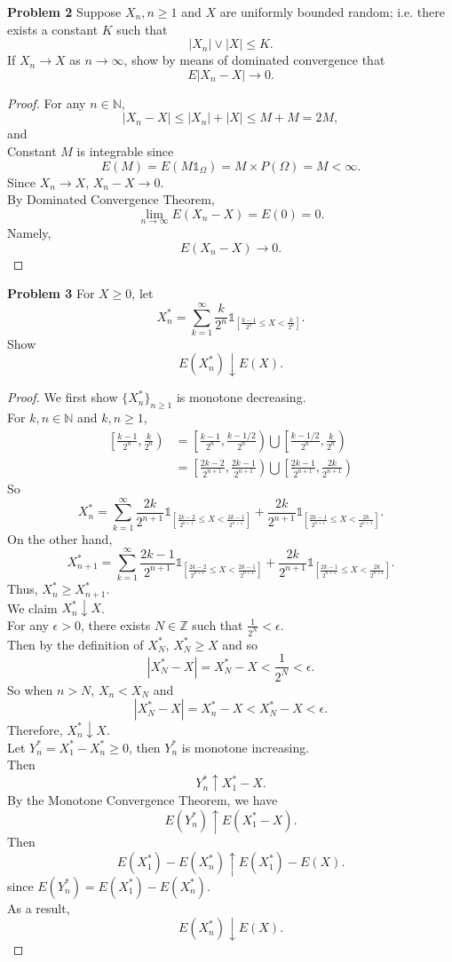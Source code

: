 \documentclass{article}
\newcommand{\idca}{\mathbb{1}}
\newcommand{\bbz}{\mathbb{Z}}
\newcommand{\bbn}{\mathbb{N}}
\begin{document}
\noindent \textbf{Problem 2} Suppose $X_n, n \geq 1$ and $X$ are uniformly bounded random; i.e. there exists a constant $K$ such that 
\[ |X_n| \vee |X| \leq K.\]
If $X_n \to X$ as $n \to \infty $, show by means of dominated convergence that 
\[E|X_n-X| \to 0.\]
\begin{proof}
  For any $n \in \bbn$,
  \[|X_n - X| \leq |X_n| + |X| \leq M + M =2M, \]
  and \\
  Constant $M$ is integrable since 
  \[ E(M)= E(M\idca_{\Omega}) = M\times P({\Omega}) =M < \infty.\]
  Since $X_n \to X$, $X_n - X \to 0$.\\
  By Dominated Convergence Theorem,
  \[\lim_{n\to \infty} E(X_n - X) = E(0) = 0.\]
  Namely,
  \[E(X_n - X) \to 0.\]

\end{proof}
\newpage

\noindent \textbf{Problem 3} For $X \geq 0$, let 
\[X_n^* = \sum_{k=1}^{\infty}\frac{k}{2^n}\idca_{[\frac{k-1}{2^n} \leq X < \frac{k}{2^n}]}.\]
Show 
\[ E(X_n^*) \downarrow E(X).\]

\begin{proof}
  We first show $\{X_n^*\}_{n \geq 1}$ is monotone decreasing.\\
  For $k,n \in \bbn$ and $k,n\geq 1$, 
  \begin{align*}
  	 \left.\left[\frac{k-1}{2^n},\frac{k}{2^n}\right.\right)  &= \left.\left[\frac{k-1}{2^n}, \frac{k-1/2}{2^n}\right)\right. \bigcup \left.\left[\frac{k-1/2}{2^n}, \frac{k}{2^n}\right)\right. \\
   															 &= \left.\left[\frac{2k-2}{2^{n+1}}, \frac{2k-1}{2^{n+1}}\right)\right. \bigcup \left.\left[\frac{2k-1}{2^{n+1}}, \frac{2k}{2^{n+1}}\right)\right.  
 \end{align*}
   	So 
   	\[ X_n^* = \sum_{k=1}^{\infty}\frac{2k}{2^{n+1}}\idca_{[\frac{2k-2}{2^{n+1}} \leq X < \frac{2k-1}{2^{n+1}}]} + \frac{2k}{2^{n+1}}\idca_{[\frac{2k-1}{2^{n+1}} \leq X < \frac{2k}{2^{n+1}}]}.\]
  On the other hand,
  \[ X_{n+1}^* = \sum_{k=1}^{\infty}\frac{2k-1}{2^{n+1}}\idca_{[\frac{2k-2}{2^{n+1}} \leq X < \frac{2k-1}{2^{n+1}}]} + \frac{2k}{2^{n+1}}\idca_{[\frac{2k-1}{2^{n+1}} \leq X < \frac{2k}{2^{n+1}}]}. \]
Thus,
	$X_n^* \geq X_{n+1}^*$. \\
We claim $X_n^* \downarrow X$.\\
For any $\epsilon > 0$, there exists $N \in \bbz$ such that $\frac{1}{2^N} < \epsilon$.\\
Then by the definition of $X_N^*$, $X_N^* \geq X$ and so  
\[|X_N^*-X| = X_N^* -X < \frac{1}{2^N} < \epsilon. \]
So when $n > N$, $X_n < X_N $ and 
\[|X_N^*-X| =X_n^* -X < X_N^* -X < \epsilon.\]
Therefore, $X_n^* \downarrow X$.\\
Let $Y_n^* = X_1^*-X_n^* \geq 0$, then $Y^*_n$ is monotone increasing.\\
Then 
\[Y_n^* \uparrow X_1^*-X.\]
By the Monotone Convergence Theorem, we have
\[E(Y_n^*) \uparrow E(X_1^*-X).\]
Then 
\[E(X_1^*)-E(X_n^*) \uparrow E(X_1^*)-E(X).\]
since $E(Y_n^*)=E(X_1^*)-E(X_n^*)$.\\
As a result, 
\[E(X_n^*) \downarrow E(X).\]

\end{proof}
\end{document}
